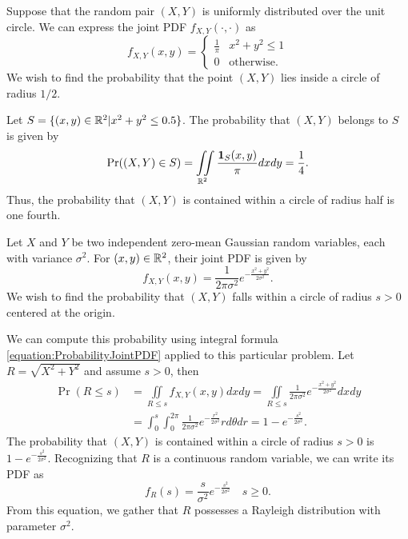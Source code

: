 \begin{example}
Suppose that the random pair $(X, Y)$ is uniformly distributed over the unit circle.
We can express the joint PDF $f_{X,Y} (\cdot, \cdot)$ as
\begin{equation*}
f_{X,Y} (x, y) = \begin{cases} \frac{1}{\pi} & x^2 + y^2 \leq 1 \\
0 & \text{otherwise} . \end{cases}
\end{equation*}
We wish to find the probability that the point $(X, Y)$ lies inside a circle of radius $1/2$.

Let $S = \{ (x, y) \in \mathbb{R}^2 | x^2 + y^2 \leq 0.5 \}$.
The probability that $(X, Y)$ belongs to $S$ is given by
\begin{equation*}
\Pr ((X,Y) \in S)
= \iint\limits_{\mathbb{R}^2}
\frac{\mathbf{1}_{S}(x, y)}{\pi} dx dy
= \frac{1}{4} .
\end{equation*}
Thus, the probability that $(X,Y)$ is contained within a circle of radius half is one fourth.
\end{example}

\begin{example}
Let $X$ and $Y$ be two independent zero-mean Gaussian random variables, each with variance $\sigma^2$.
For $(x, y) \in \mathbb{R}^2$, their joint PDF is given by
\begin{equation*}
f_{X,Y} (x,y) = \frac{1}{2 \pi \sigma^2} e^{- \frac{x^2 + y^2}{2 \sigma^2} } .
\end{equation*}
We wish to find the probability that $(X,Y)$ falls within a circle of radius $s > 0$ centered at the origin.

We can compute this probability using integral formula \eqref{equation:ProbabilityJointPDF} applied to this particular problem.
Let $R = \sqrt{X^2 + Y^2}$ and assume $s > 0$, then
\begin{equation*}
\begin{split}
\Pr (R \leq s) &= \iint\limits_{R \leq s} f_{X,Y} (x,y) dx dy
= \iint\limits_{R \leq s} \frac{1}{2 \pi \sigma^2}
e^{- \frac{ x^2 + y^2 }{2 \sigma^2} } dx dy \\
&= \int_0^s \int_0^{2\pi} \frac{1}{2 \pi \sigma^2}
e^{- \frac{ r^2 }{2 \sigma^2} } r d\theta dr
= 1 - e^{- \frac{ s^2 }{2 \sigma^2} } .
\end{split}
\end{equation*}
The probability that $(X, Y)$ is contained within a circle of radius $s>0$ is $1 - e^{- \frac{ s^2 }{2 \sigma^2} }$.
Recognizing that $R$ is a continuous random variable, we can write its PDF as
\begin{equation*}
f_R (s) = \frac{s}{\sigma^2} e^{- \frac{s^2}{2 \sigma^2} } \quad s \geq 0 .
\end{equation*}
From this equation, we gather that $R$ possesses a Rayleigh distribution with parameter $\sigma^2$.
\end{example}


